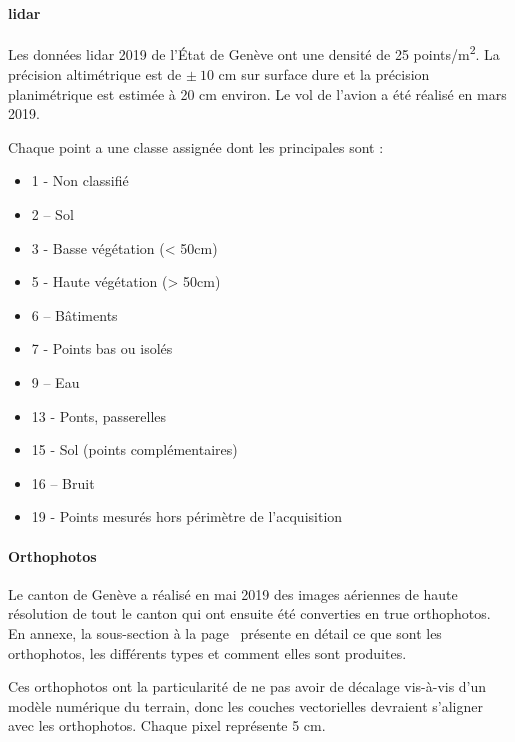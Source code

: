 \paragraph{\gls{lidar}}

\par{Les données \gls{lidar} 2019 \cite{sitg_nuages_2019} de l'État de Genève ont une densité de 25 \si{\unit{points/m^2}}. La précision altimétrique est de $\pm\ 10$ \si{\unit{cm}} sur surface dure et la précision planimétrique est estimée à 20 \si{\unit{cm}} environ. Le vol de l'avion a été réalisé en mars 2019.}

Chaque point a une classe assignée dont les principales sont :
\begin{itemize}
    \item 1 - Non classifié
    \item 2 – Sol
    \item 3 - Basse végétation (< 50cm)
    \item 5 - Haute végétation (> 50cm)
    \item 6 – Bâtiments
    \item 7 - Points bas ou isolés
    \item 9 – Eau
    \item 13 - Ponts, passerelles
    \item 15 - Sol (points complémentaires)
    \item 16 – Bruit
    \item 19 - Points mesurés hors périmètre de l'acquisition
\end{itemize}

\paragraph{Orthophotos}
Le canton de Genève a réalisé en mai 2019 des images aériennes de haute résolution \cite{sitg_orthophotos_nodate} de tout le canton qui ont ensuite été converties en true orthophotos. En annexe, la sous-section \textit{} à la page~\pageref{subsec:annexe_ortophotos} présente en détail ce que sont les orthophotos, les différents types et comment elles sont produites.

\par{Ces orthophotos ont la particularité de ne pas avoir de décalage vis-à-vis d'un modèle numérique du terrain, donc les couches vectorielles devraient s'aligner avec les orthophotos. Chaque pixel représente 5 \si{\unit{cm}}.}

